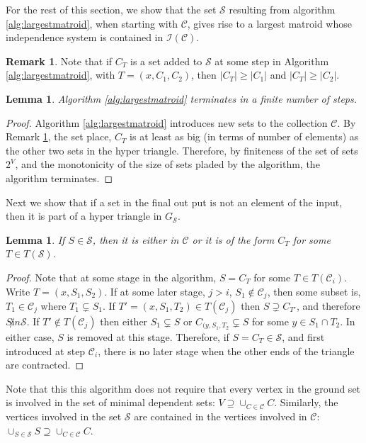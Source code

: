 \documentclass[11pt]{article}
\newcommand{\sI}{\mathscr{I}}
\newcommand{\sC}{\mathscr{C}}
\newcommand{\sS}{\mathscr{S}}
\newtheorem{lem}[thm]{Lemma}
\theoremstyle{remark}
\theoremstyle{definition}
\newtheorem{rmk}[thm]{Remark}
\begin{document}
For the rest of this section, we show that the set $\sS$ resulting from algorithm \ref{alg:largestmatroid}, when starting with $\sC$, gives rise to a largest matroid whose independence system is contained in $\sI(\sC)$. 

\begin{rmk}\label{rmk:placementmonotonic}
    Note that if $C_T$ is a set added to $\sS$ at some step in Algorithm \ref{alg:largestmatroid}, with $T = (x, C_1, C_2)$, then $|C_T| \geq |C_1|$ and $|C_T| \geq |C_2|$.
\end{rmk}

\begin{lem} \label{res:algoterminates}
    Algorithm \ref{alg:largestmatroid} terminates in a finite number of steps. 
\end{lem}
\begin{proof}
    Algorithm \ref{alg:largestmatroid} introduces new sets to the collection $\sC$. By Remark \ref{rmk:placementmonotonic}, the set place, $C_T$ is at least as big (in terms of number of elements) as the other two sets in the hyper triangle. Therefore, by finiteness of the set of sets $2^V$, and the monotonicity of the size of sets pladed by the algorithm, the algorithm terminates.
\end{proof}

Next we show that if a set in the final out put is not an element of the input, then it is part of a hyper triangle in $G_\sS$.

\begin{lem} \label{res:placedsetsCT}
    If $S \in \sS$, then it is either in $\sC$ or it is of the form $C_T$ for some $T \in T(\sS)$.
\end{lem}
\begin{proof}
Note that at some stage in the algorithm, $S = C_T$ for some $T \in T(\sC_{i})$. Write $T = (x, S_1, S_2)$. If at some later stage, $j > i$, $S_1 \not \in \sC_j$, then some subset is, $T_1 \in \sC_j$ where $T_1 \subsetneq S_1$. If $T' = (x, S_1, T_2) \in T(\sC_j)$ then $S \supsetneq C_{T'}$, and therefore $S \not in \sS$. If $T' \not \in T(\sC_{j})$ then either $S_1 \subsetneq S$ or $C_{(y, S_1, T_2} \subsetneq S$ for some $y \in S_1 \cap T_2$. In either case, $S$ is removed at this stage. Therefore, if $S = C_T \in \sS$, and first introduced at step $\sC_i$, there is no later stage when the other ends of the triangle are contracted.
\end{proof}

Note that this this algorithm does not require that every vertex in the ground set is involved in the set of minimal dependent sets: $V \supseteq \cup_{C \in \sC} C$. Similarly,  the vertices involved in the set $\sS$ are contained in the vertices involved in $\sC$: $\cup_{S \in \sS} S \supseteq \cup_{C \in \sC} C$. 
\end{document}
